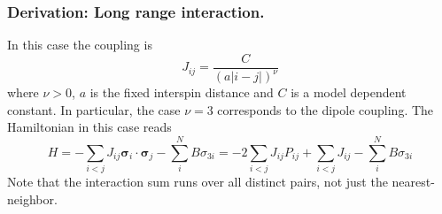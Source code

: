 \documentclass[../../../main.tex]{subfiles}
\begin{document}
\subsubsection{Derivation: Long range interaction.}
In this case the coupling is
\begin{equation*}
    J_{ij} = \frac{C}{\left(a|i-j|\right)^\nu}
\end{equation*}
where $\nu>0$, $a$ is the fixed interspin distance and $C$ is a model dependent constant.
In particular, the case $\nu= 3$ corresponds to the dipole coupling.
The Hamiltonian in this case reads
\begin{equation*}
    H =  - \sum_{i<j} J_{ij} \boldsymbol{\sigma}_i \cdot\boldsymbol{\sigma}_{j} - \sum_{i } ^N B \sigma_{3i}
    =  -2\sum_{i<j}J_{ij}  P_{ij} + \sum_{i<j} J_{ij} - \sum_{i } ^N B \sigma_{3i}
\end{equation*}
Note that the interaction sum runs over all distinct pairs, not just the nearest-neighbor.
\end{document}
